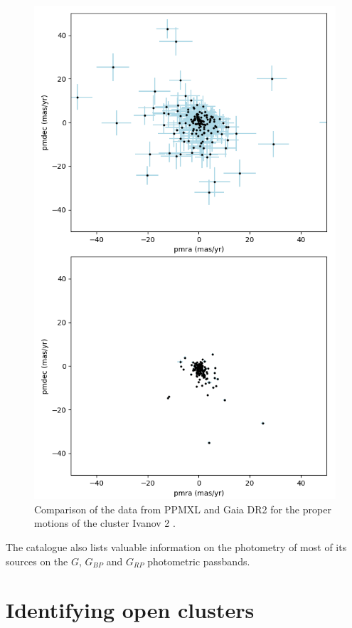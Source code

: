 \documentclass[twocolumn]{revtex4}
\begin{document}
\begin{figure}[h!]
\centering
\includegraphics[scale=0.45]{ppmxl_vs_gaia_motions}
\caption{Comparison of the data from PPMXL and Gaia DR2 for the proper motions of the cluster Ivanov 2 \cite{ivanov}.}
\label{ppmxl_vs_gaiadr2}
\end{figure}

The catalogue also lists valuable information on the photometry of most of its sources on the $G$, $G_{BP}$ and $G_{RP}$ photometric passbands.

\section{Identifying open clusters}
\end{document}
